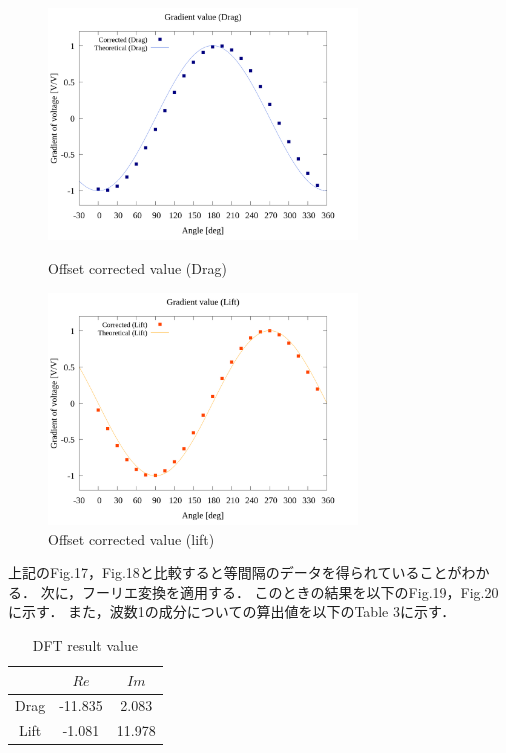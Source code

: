 \documentclass[twocolumn,a4j]{jsarticle}
\begin{document}
\begin{figure} [htbp]
    \begin{center}
    \includegraphics[width=82mm]{../../../02_workspace/result/simulation_tx=10.0_ty=-5.0_dx=5.00_dy=-2.50/plot/21/21-3_interpolated_drag.png}
    \caption{Offset corrected value (Drag)}
    \includegraphics[width=82mm]{../../../02_workspace/result/simulation_tx=10.0_ty=-5.0_dx=5.00_dy=-2.50/plot/21/21-3_interpolated_lift.png}
    \caption{Offset corrected value (lift)}
    \end{center}
\end{figure}

    \newpage

上記のFig.17，Fig.18と比較すると等間隔のデータを得られていることがわかる．
次に，フーリエ変換を適用する．
このときの結果を以下のFig.19，Fig.20 に示す．
また，波数1の成分についての算出値を以下のTable 3に示す．

\begin{table}[htbp]
    \begin{center}
        \caption{DFT result value}
        \begin{tabular}{|p{30mm}|p{20mm}|p{20mm}|}
            \hline
            \multicolumn{1}{|c|}{}       & \multicolumn{1}{|c|}{$Re$}   & \multicolumn{1}{|c|}{$Im$} \\ \hline
            \multicolumn{1}{|c|}{Drag} & \multicolumn{1}{|c|}{-11.835}     & \multicolumn{1}{|c|}{2.083}         \\ \hline
            \multicolumn{1}{|c|}{Lift} & \multicolumn{1}{|c|}{-1.081}     & \multicolumn{1}{|c|}{11.978}         \\ \hline
        \end{tabular}
    \end{center}
\end{table}
\end{document}
